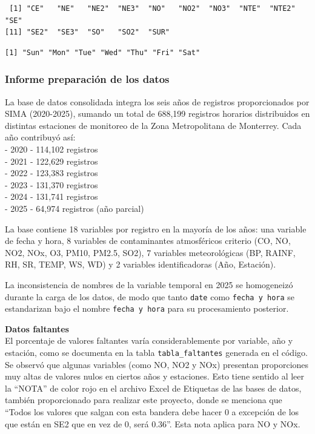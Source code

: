 \documentclass[
  letterpaper,
  DIV=11,
  numbers=noendperiod]{scrartcl}
\newenvironment{Shaded}{\begin{snugshade}}{\end{snugshade}}
\newcommand{\FunctionTok}[1]{\textcolor[rgb]{0.28,0.35,0.67}{#1}}
\newcommand{\NormalTok}[1]{\textcolor[rgb]{0.00,0.23,0.31}{#1}}
\newcommand{\SpecialCharTok}[1]{\textcolor[rgb]{0.37,0.37,0.37}{#1}}
\begin{document}
\begin{verbatim}
 [1] "CE"   "NE"   "NE2"  "NE3"  "NO"   "NO2"  "NO3"  "NTE"  "NTE2" "SE"  
[11] "SE2"  "SE3"  "SO"   "SO2"  "SUR" 
\end{verbatim}

\begin{Shaded}
\end{Shaded}

\begin{verbatim}
[1] "Sun" "Mon" "Tue" "Wed" "Thu" "Fri" "Sat"
\end{verbatim}

\subsubsection{Informe preparación de los
datos}\label{informe-preparaciuxf3n-de-los-datos}

La base de datos consolidada integra los seis años de registros
proporcionados por SIMA (2020-2025), sumando un total de 688,199
registros horarios distribuidos en distintas estaciones de monitoreo de
la Zona Metropolitana de Monterrey. Cada año contribuyó así:\\
- 2020 - 114,102 registros\\
- 2021 - 122,629 registros\\
- 2022 - 123,383 registros\\
- 2023 - 131,370 registros\\
- 2024 - 131,741 registros\\
- 2025 - 64,974 registros (año parcial)

La base contiene 18 variables por registro en la mayoría de los años:
una variable de fecha y hora, 8 variables de contaminantes atmosféricos
criterio (CO, NO, NO2, NOx, O3, PM10, PM2.5, SO2), 7 variables
meteorológicas (BP, RAINF, RH, SR, TEMP, WS, WD) y 2 variables
identificadoras (Año, Estación).

La inconsistencia de nombres de la variable temporal en 2025 se
homogeneizó durante la carga de los datos, de modo que tanto
\texttt{date} como \texttt{fecha\ y\ hora} se estandarizan bajo el
nombre \texttt{fecha\ y\ hora} para su procesamiento posterior.

\textbf{Datos faltantes}\\
El porcentaje de valores faltantes varía considerablemente por variable,
año y estación, como se documenta en la tabla \texttt{tabla\_faltantes}
generada en el código. Se observó que algunas variables (como NO, NO2 y
NOx) presentan proporciones muy altas de valores nulos en ciertos años y
estaciones. Esto tiene sentido al leer la ``NOTA'' de color rojo en el
archivo Excel de Etiquetas de las bases de datos, también proporcionado
para realizar este proyecto, donde se menciona que ``Todos los valores
que salgan con esta bandera debe hacer 0 a excepción de los que están en
SE2 que en vez de 0, será 0.36''. Esta nota aplica para NO y NOx.
\end{document}
